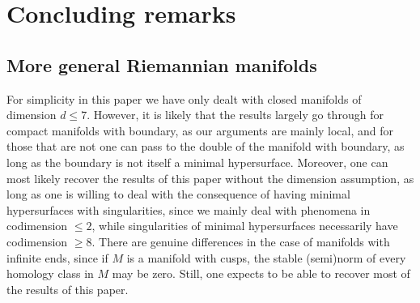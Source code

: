 \documentclass[reqno,11pt]{amsart}
\newcommand*\dif{\mathop{}\!\mathrm{d}}
\theoremstyle{definition}
\numberwithin{equation}{section}
\newcommand\todo[1]{\textcolor{red}{TODO: #1}}
\begin{document}













\section{Concluding remarks}\label{open problems}
\subsection{More general Riemannian manifolds}
For simplicity in this paper we have only dealt with closed manifolds of dimension $d \leq 7$.
However, it is likely that the results largely go through for compact manifolds with boundary, as our arguments are mainly local, and for those that are not one can pass to the double of the manifold with boundary, as long as the boundary is not itself a minimal hypersurface.
Moreover, one can most likely recover the results of this paper without the dimension assumption, as long as one is willing to deal with the consequence of having minimal hypersurfaces with singularities, since we mainly deal with phenomena in codimension $\leq 2$, while singularities of minimal hypersurfaces necessarily have codimension $\geq 8$. 
There are genuine differences in the case of manifolds with infinite ends, since if $M$ is a manifold with cusps, the stable (semi)norm of every homology class in $M$ may be zero.
Still, one expects to be able to recover most of the results of this paper.
\end{document}

